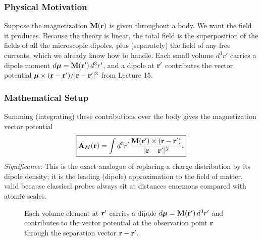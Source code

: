 \subsubsection*{Physical Motivation}
Suppose the magnetization $\mathbf{M}(\mathbf{r})$ is given throughout a body.  We want the
field it produces.  Because the theory is linear, the total field is the superposition
of the fields of all the microscopic dipoles, plus (separately) the field of any free
currents, which we already know how to handle.  Each small volume $d^3r'$ carries a
dipole moment $d\boldsymbol{\mu}=\mathbf{M}(\mathbf{r}')\,d^3r'$, and a dipole at $\mathbf{r}'$ contributes the
vector potential $\boldsymbol{\mu}\times(\mathbf{r}-\mathbf{r}')/|\mathbf{r}-\mathbf{r}'|^3$ from Lecture 15.

\subsubsection*{Mathematical Setup}
Summing (integrating) these contributions over the body gives the magnetization vector
potential
\begin{equation}\label{eq:lec17-Am}
  \boxed{\mathbf{A}_M(\mathbf{r})
  =\int d^3r'\,
  \frac{\mathbf{M}(\mathbf{r}')\times(\mathbf{r}-\mathbf{r}')}{|\mathbf{r}-\mathbf{r}'|^3}.}
\end{equation}
\textit{Significance:} This is the exact analogue of replacing a charge distribution by
its dipole density; it is the leading (dipole) approximation to the field of matter,
valid because classical probes always sit at distances enormous compared with atomic
scales.

\begin{figure}[h]
\centering
{}
\caption{Each volume element at $\mathbf{r}'$ carries a dipole $d\boldsymbol{\mu}=\mathbf{M}(\mathbf{r}')\,d^3r'$
and contributes to the vector potential at the observation point $\mathbf{r}$ through the
separation vector $\mathbf{r}-\mathbf{r}'$.}
\label{fig:lec17-superposition}
\end{figure}

